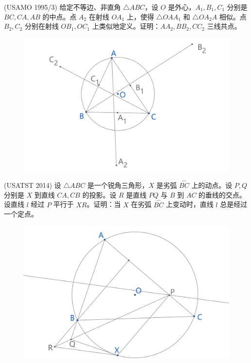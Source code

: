 \begin{exercise}
    (USAMO 1995/3) 给定不等边、非直角 $\triangle ABC$，设 $O$ 是外心，$A_1, B_1, C_1$ 分别是 ${BC}, {CA}, {AB}$ 的中点。点 $A_2$ 在射线 $OA_1$ 上，使得 $\triangle OAA_1$ 和 $\triangle OA_2A$ 相似。点 $B_2, C_2$ 分别在射线 $OB_1, OC_1$ 上类似地定义。证明：$AA_2, BB_2, CC_2$ 三线共点。
\end{exercise}
\begin{figure}[H]
    \centering
    \includegraphics[width=0.7\linewidth]{figures/exercises/443.png}
\end{figure}


\newpage 
\begin{exercise}
    (USATST 2014) 设 $\triangle ABC$ 是一个锐角三角形，$X$ 是劣弧 $\overset{\frown}{BC}$ 上的动点。设 $P, Q$ 分别是 $X$ 到直线 $CA, CB$ 的投影。设 $R$ 是直线 $PQ$ 与 $B$ 到 $AC$ 的垂线的交点。设直线 $l$ 经过 $P$ 平行于 ${XR}$。证明：当 $X$ 在劣弧 $\overset{\frown}{BC}$ 上变动时，直线 $l$ 总是经过一个定点。
\end{exercise}
\begin{figure}[H]
    \centering
    \includegraphics[width=0.7\linewidth]{figures/exercises/444.png}
\end{figure}


